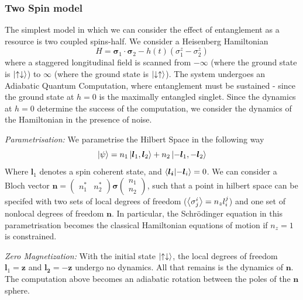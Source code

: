 \documentclass{article}
\let\vec\bm
\begin{document}
\subsubsection{Two Spin model}
%
The simplest model in which we can consider the effect of entanglement as a resource is two coupled spins-half. 
We consider a Heisenberg Hamiltonian
\begin{equation}
    H = \vec{\sigma}_1\cdot\vec{\sigma}_2 -h(t) \left(\sigma_1^z-\sigma_2^z\right)\label{eq:hamiltonian}
\end{equation}
where a staggered longitudinal field is scanned from $-\infty$ (where the ground state is $\ket{\uparrow\downarrow}$) to $\infty$ (where the ground state is $\ket{\downarrow\uparrow}$).
The system undergoes an Adiabatic Quantum Computation, where entanglement must be sustained - since the ground state at $h=0$ is the maximally entangled singlet. 
Since the dynamics at $h=0$ determine the success of the computation, we consider the dynamics of the Hamiltonian in the presence of noise. 

{\it Parametrisation: } We parametrise the Hilbert Space in the following way
\begin{equation}
    \ket{\psi} = n_1 \ket{\vec{l}_1, \vec{l}_2} + n_2 \ket{-\vec{l}_1, -\vec{l}_2}\label{eq:parametrisation}
\end{equation}
Where $\vec{l}_1$ denotes a spin coherent state, and $\braket{\vec{l_i}}{-\vec{l}_i} = 0$.
We can consider a Bloch vector $\vec{n} = \begin{pmatrix} n_1^* & n_2^* \end{pmatrix}\vec{\sigma} \begin{pmatrix} n_1 \\ n_2 \end{pmatrix}$, such that a point in hilbert space can be specifed with two sets of local degrees of freedom ($\ev{\sigma^i_j} = n_z l_i^j$) and one set of nonlocal degrees of freedom $\vec{n}$.
In particular, the Schr\"odinger equation in this parametrisation becomes the classical Hamiltonian equations of motion if $n_z=1$ is constrained.

{\it Zero Magnetization: } With the initial state $\ket{\uparrow \downarrow}$, the local degrees of freedom $\vec{l}_1 = \vec{z}$ and $\vec{l_2} = -\vec{z}$ undergo no dynamics. 
All that remains is the dynamics of $\vec{n}$.
The computation above becomes an adiabatic rotation between the poles of the $\vec{n}$ sphere.
\end{document}
